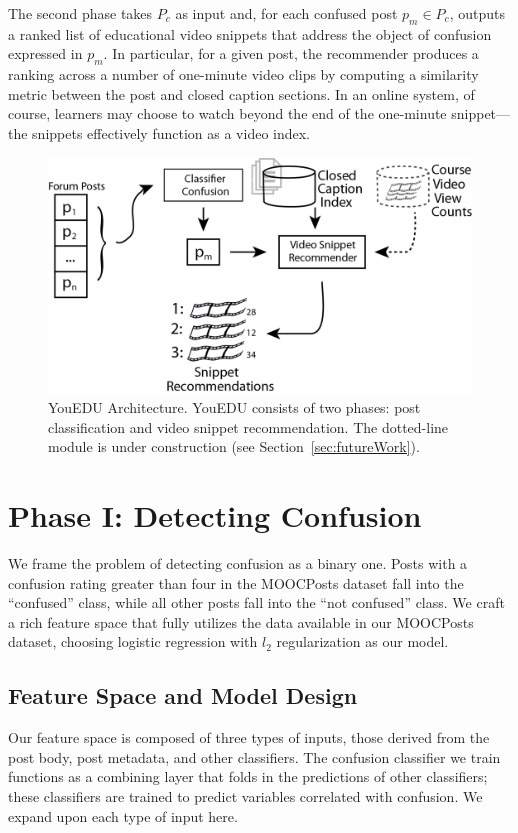 \documentclass{edm_template}
\begin{document}
The second phase takes $P_{c}$ as input and, for each confused post $p_{m} \in P_{c}$, outputs a ranked list of educational video snippets that address the object of confusion expressed in $p_{m}$. In particular, for a given post, the recommender produces a ranking across a number of one-minute video clips by computing a similarity metric between the post and closed caption sections. In an online system, of course, learners may choose to watch beyond the end of the one-minute snippet---the snippets effectively function as a video index.
\begin{figure}[htp]
       \centering
       \includegraphics[width=1.0\textwidth]{../Figs/youEduArch.png}
       \caption{\textnormal{YouEDU Architecture. YouEDU 
           consists of two phases: post classification and video
           snippet recommendation. The dotted-line module is under
           construction (see Section~\ref{sec:futureWork}).}}
       \label{figure:architecture}
\end{figure}

\section{Phase I: Detecting Confusion}
\label{sec:confusionDetection}

We frame the problem of detecting confusion as a binary one. Posts with a confusion rating greater than four in the MOOCPosts dataset fall into the ``confused'' class, while all other posts fall into the ``not confused'' class. We craft a rich feature space that fully utilizes the data available in our MOOCPosts dataset, choosing logistic regression with $l_{2}$ regularization as our model.

\subsection{Feature Space and Model Design}
Our feature space is composed of three types of inputs, those derived from the post body, post metadata, and other classifiers. The confusion classifier we train functions as a combining layer that folds in the predictions of other classifiers; these classifiers are trained to predict variables correlated with confusion. We expand upon each type of input here.
\end{document}
